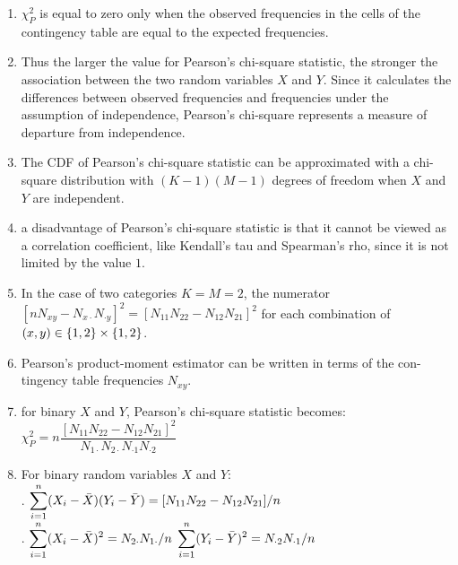 \begin{enumerate}
    \item $\chi^2_P$ is equal to zero only when the observed frequencies in the cells of the contingency table are equal to the expected frequencies. 
    \hfill \cite{statistics/book/Statistics-for-Data-Scientists/Maurits-Kaptein}

    \item Thus the larger the value for Pearson’s chi-square statistic, the stronger the association between the two random variables $X$ and $Y $. 
    Since it calculates the differences between observed frequencies and frequencies under the assumption of independence, Pearson’s chi-square represents a measure of departure from independence.
    \hfill \cite{statistics/book/Statistics-for-Data-Scientists/Maurits-Kaptein}

    \item The CDF of Pearson’s chi-square statistic can be approximated with a chi-square distribution with $(K - 1)(M - 1)$ degrees of freedom when $X$ and $Y$ are independent.
    \hfill \cite{statistics/book/Statistics-for-Data-Scientists/Maurits-Kaptein}

    \item a disadvantage of Pearson’s chi-square statistic is that it cannot be viewed as a correlation coefficient, like Kendall’s tau and Spearman’s rho, since it is not limited by the value $1$. 
    \hfill \cite{statistics/book/Statistics-for-Data-Scientists/Maurits-Kaptein}

    \item  In the case of two categories $K = M = 2$, the numerator $[n N_{x y} - N_{x\cdot } N_{\cdot y} ]^2 = [N_{11} N_{22} - N_{12} N_{21}]^2$ for each combination of $(x, y) \in \left\{1, 2\right\} \times \left\{1, 2\right\}$.
    \hfill \cite{statistics/book/Statistics-for-Data-Scientists/Maurits-Kaptein}

    \item Pearson’s product-moment estimator can be written in terms of the con- tingency table frequencies $N_{x y }$. 
    \hfill \cite{statistics/book/Statistics-for-Data-Scientists/Maurits-Kaptein}

    \item for binary $X$ and $Y $, Pearson’s chi-square statistic becomes:
    $
        \chi^2_P = n \dfrac{[N_{11} N_{22} - N_{12} N_{21}]^2}{N_{1\cdot } N_{2\cdot } N_{\cdot 1} N_{\cdot 2}}
    $
    \hfill \cite{statistics/book/Statistics-for-Data-Scientists/Maurits-Kaptein}

    \item For binary random variables $X$ and $Y$:
    \hfill \cite{statistics/book/Statistics-for-Data-Scientists/Maurits-Kaptein}
    \\[0.3cm]
    .\hfill
    $\displaystyle\sum^n_{i=1} (X_i - \bar{X})(Y_i - \bar{Y} ) = [N_{11} N_{22} - N_{12} N_{21}]/n$
    \hfill \cite{statistics/book/Statistics-for-Data-Scientists/Maurits-Kaptein}
    \\[0.3cm]
    .\hfill
    $ \displaystyle\sum^n_{i=1} (X_i - \bar{X})^2 = N_{2\cdot } N_{1\cdot }/n $
    \hfill
    $ \displaystyle\sum^n_{i=1} (Y_i - \bar{Y} )^2 = N_{\cdot 2} N_{\cdot 1}/n $
    \hfill \cite{statistics/book/Statistics-for-Data-Scientists/Maurits-Kaptein}


\end{enumerate}

